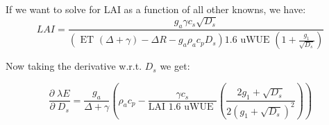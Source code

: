 If we want to solve for LAI as a function of all other knowns, we have:
\begin{equation}
LAI  = \frac{g_a \gamma c_s \sqrt{D_s}}{ \left(\text{ ET } ( \Delta + \gamma) - \Delta R - g_a \rho_a c_p D_{s}\right) 1.6 \text{ uWUE } (1 + \frac{g_1}{\sqrt{D_s}})}
\end{equation}

Now taking the derivative w.r.t. $D_s$ we get:

\begin{equation}
\frac{\partial \;  \lambda E}{\partial \; D_s} = \frac{g_a}{\Delta + \gamma}   \left( \rho_a c_p - \frac{\gamma c_s }{\text{LAI }1.6 \text{ uWUE }} \left( \frac{2 g_1 + \sqrt{D_s}}{2 (g_1 + \sqrt{D_s})^2}\right) \right)
\end{equation}


